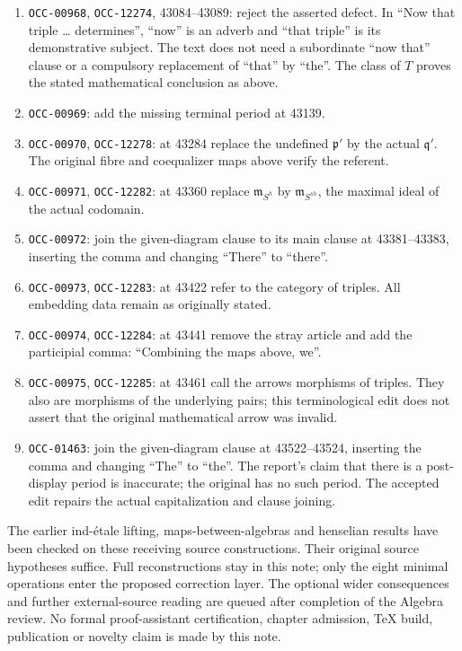 \begin{enumerate}
\def\labelenumi{\arabic{enumi}.}
\tightlist
\item
  \texttt{OCC-00968}, \texttt{OCC-12274}, 43084--43089: reject the asserted defect. In ``Now that triple \ldots{} determines'', ``now'' is an adverb and ``that triple'' is its demonstrative subject. The text does not need a subordinate ``now that'' clause or a compulsory replacement of ``that'' by ``the''. The class of \(T\) proves the stated mathematical conclusion as above.
\item
  \texttt{OCC-00969}: add the missing terminal period at 43139.
\item
  \texttt{OCC-00970}, \texttt{OCC-12278}: at 43284 replace the undefined \(\mathfrak p'\) by the actual \(\mathfrak q'\). The original fibre and coequalizer maps above verify the referent.
\item
  \texttt{OCC-00971}, \texttt{OCC-12282}: at 43360 replace \(\mathfrak m_{S^h}\) by \(\mathfrak m_{S^{sh}}\), the maximal ideal of the actual codomain.
\item
  \texttt{OCC-00972}: join the given-diagram clause to its main clause at 43381--43383, inserting the comma and changing ``There'' to ``there''.
\item
  \texttt{OCC-00973}, \texttt{OCC-12283}: at 43422 refer to the category of triples. All embedding data remain as originally stated.
\item
  \texttt{OCC-00974}, \texttt{OCC-12284}: at 43441 remove the stray article and add the participial comma: ``Combining the maps above, we''.
\item
  \texttt{OCC-00975}, \texttt{OCC-12285}: at 43461 call the arrows morphisms of triples. They also are morphisms of the underlying pairs; this terminological edit does not assert that the original mathematical arrow was invalid.
\item
  \texttt{OCC-01463}: join the given-diagram clause at 43522--43524, inserting the comma and changing ``The'' to ``the''. The report's claim that there is a post-display period is inaccurate; the original has no such period. The accepted edit repairs the actual capitalization and clause joining.
\end{enumerate}

The earlier ind-étale lifting, maps-between-algebras and henselian results have been checked on these receiving source constructions. Their original source hypotheses suffice. Full reconstructions stay in this note; only the eight minimal operations enter the proposed correction layer. The optional wider consequences and further external-source reading are queued after completion of the Algebra review. No formal proof-assistant certification, chapter admission, TeX build, publication or novelty claim is made by this note.
